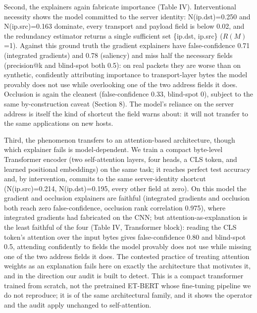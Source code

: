 \documentclass[journal]{IEEEtran}
\begin{document}
Second, the explainers again fabricate importance (Table IV).
Interventional necessity shows the model committed to the server
identity: N(ip.dst)=0.250 and N(ip.src)=0.163 dominate, every transport
and payload field is below 0.02, and the redundancy estimator returns a
single sufficient set \{ip.dst, ip.src\} ($R(M)$=1). Against this ground
truth the gradient explainers have false-confidence 0.71 (integrated
gradients) and 0.78 (saliency) and miss half the necessary fields
(precision@k and blind-spot both 0.5): on real packets they are worse
than on synthetic, confidently attributing importance to transport-layer
bytes the model provably does not use while overlooking one of the two
address fields it does. Occlusion is again the cleanest
(false-confidence 0.33, blind-spot 0), subject to the same
by-construction caveat (Section 8). The model's reliance on the server
address is itself the kind of shortcut the field warns about: it will
not transfer to the same applications on new hosts.

Third, the phenomenon transfers to an attention-based architecture,
though which explainer fails is model-dependent. We train a compact
byte-level Transformer encoder (two self-attention layers, four heads, a
CLS token, and learned positional embeddings) on the same task; it
reaches perfect test accuracy and, by intervention, commits to the same
server-identity shortcut (N(ip.src)=0.214, N(ip.dst)=0.195, every other
field at zero). On this model the gradient and occlusion explainers are
faithful (integrated gradients and occlusion both reach zero
false-confidence, occlusion rank correlation 0.975), where integrated
gradients had fabricated on the CNN; but attention-as-explanation is the
least faithful of the four (Table IV, Transformer block): reading the
CLS token's attention over the input bytes gives false-confidence 0.80
and blind-spot 0.5, attending confidently to fields the model provably
does not use while missing one of the two address fields it does. The
contested practice of treating attention weights as an explanation fails
here on exactly the architecture that motivates it, and in the direction
our audit is built to detect. This is a compact transformer trained from
scratch, not the pretrained ET-BERT whose fine-tuning pipeline we do not
reproduce; it is of the same architectural family, and it shows the
operator and the audit apply unchanged to self-attention.
\end{document}
